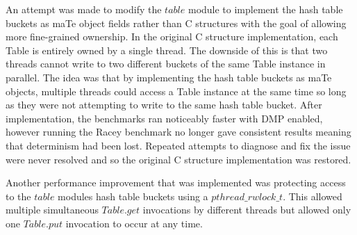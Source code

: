 An attempt was made to modify the $table$ module to implement the hash
table buckets as maTe object fields rather than C structures with the
goal of allowing more fine-grained ownership.  In the original C
structure implementation, each Table is entirely owned by a single
thread.  The downside of this is that two threads cannot write to two
different buckets of the same Table instance in parallel.  The idea
was that by implementing the hash table buckets as maTe objects,
multiple threads could access a Table instance at the same time so
long as they were not attempting to write to the same hash table
bucket.  After implementation, the benchmarks ran noticeably faster
with DMP enabled, however running the Racey benchmark no longer gave
consistent results meaning that determinism had been lost.  Repeated
attempts to diagnose and fix the issue were never resolved and so the
original C structure implementation was restored.

Another performance improvement that was implemented was protecting
access to the $table$ modules hash table buckets using a
$pthread\_rwlock\_t$.  This allowed multiple simultaneous $Table.get$
invocations by different threads but allowed only one $Table.put$
invocation to occur at any time.

